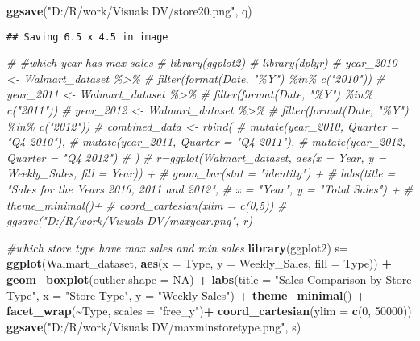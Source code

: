 \documentclass[
]{article}
\newenvironment{Shaded}{\begin{snugshade}}{\end{snugshade}}
\newcommand{\AttributeTok}[1]{\textcolor[rgb]{0.13,0.29,0.53}{#1}}
\newcommand{\CommentTok}[1]{\textcolor[rgb]{0.56,0.35,0.01}{\textit{#1}}}
\newcommand{\ConstantTok}[1]{\textcolor[rgb]{0.56,0.35,0.01}{#1}}
\newcommand{\DecValTok}[1]{\textcolor[rgb]{0.00,0.00,0.81}{#1}}
\newcommand{\FunctionTok}[1]{\textcolor[rgb]{0.13,0.29,0.53}{\textbf{#1}}}
\newcommand{\NormalTok}[1]{#1}
\newcommand{\OtherTok}[1]{\textcolor[rgb]{0.56,0.35,0.01}{#1}}
\newcommand{\SpecialCharTok}[1]{\textcolor[rgb]{0.81,0.36,0.00}{\textbf{#1}}}
\newcommand{\StringTok}[1]{\textcolor[rgb]{0.31,0.60,0.02}{#1}}
\begin{document}
\begin{Shaded}
\begin{Highlighting}[]
\FunctionTok{ggsave}\NormalTok{(}\StringTok{"D:/R/work/Visuals DV/store20.png"}\NormalTok{, q)}
\end{Highlighting}
\end{Shaded}

\begin{verbatim}
## Saving 6.5 x 4.5 in image
\end{verbatim}

\begin{Shaded}
\begin{Highlighting}[]
\CommentTok{\# \#which year has max sales}
\CommentTok{\# library(ggplot2)}
\CommentTok{\# library(dplyr)}
\CommentTok{\# year\_2010 \textless{}{-} Walmart\_dataset \%\textgreater{}\%}
\CommentTok{\#   filter(format(Date, "\%Y") \%in\% c("2010"))}
\CommentTok{\# year\_2011 \textless{}{-} Walmart\_dataset \%\textgreater{}\%}
\CommentTok{\#   filter(format(Date, "\%Y") \%in\% c("2011"))}
\CommentTok{\# year\_2012 \textless{}{-} Walmart\_dataset \%\textgreater{}\%}
\CommentTok{\#   filter(format(Date, "\%Y") \%in\% c("2012"))}
\CommentTok{\# combined\_data \textless{}{-} rbind(}
\CommentTok{\#   mutate(year\_2010, Quarter = "Q4 2010"),}
\CommentTok{\#   mutate(year\_2011, Quarter = "Q4 2011"),}
\CommentTok{\#   mutate(year\_2012, Quarter = "Q4 2012")}
\CommentTok{\# )}
\CommentTok{\# r=ggplot(Walmart\_dataset, aes(x = Year, y = Weekly\_Sales, fill = Year)) +}
\CommentTok{\#   geom\_bar(stat = "identity") +}
\CommentTok{\#   labs(title = "Sales for the Years 2010, 2011 and 2012",}
\CommentTok{\#        x = "Year", y = "Total Sales") +}
\CommentTok{\#   theme\_minimal()+ }
\CommentTok{\#   coord\_cartesian(xlim = c(0,5))}
\CommentTok{\# ggsave("D:/R/work/Visuals DV/maxyear.png", r)}

\CommentTok{\#which store type have max sales and min sales}
\FunctionTok{library}\NormalTok{(ggplot2)}
\NormalTok{s}\OtherTok{=} \FunctionTok{ggplot}\NormalTok{(Walmart\_dataset, }\FunctionTok{aes}\NormalTok{(}\AttributeTok{x =}\NormalTok{ Type, }\AttributeTok{y =}\NormalTok{ Weekly\_Sales, }\AttributeTok{fill =}\NormalTok{ Type)) }\SpecialCharTok{+}
  \FunctionTok{geom\_boxplot}\NormalTok{(}\AttributeTok{outlier.shape =} \ConstantTok{NA}\NormalTok{) }\SpecialCharTok{+}
  \FunctionTok{labs}\NormalTok{(}\AttributeTok{title =} \StringTok{"Sales Comparison by Store Type"}\NormalTok{,}
       \AttributeTok{x =} \StringTok{"Store Type"}\NormalTok{,}
       \AttributeTok{y =} \StringTok{"Weekly Sales"}\NormalTok{) }\SpecialCharTok{+}
  \FunctionTok{theme\_minimal}\NormalTok{() }\SpecialCharTok{+}
  \FunctionTok{facet\_wrap}\NormalTok{(}\SpecialCharTok{\textasciitilde{}}\NormalTok{Type, }\AttributeTok{scales =} \StringTok{"free\_y"}\NormalTok{)}\SpecialCharTok{+}
  \FunctionTok{coord\_cartesian}\NormalTok{(}\AttributeTok{ylim =} \FunctionTok{c}\NormalTok{(}\DecValTok{0}\NormalTok{, }\DecValTok{50000}\NormalTok{))}
\FunctionTok{ggsave}\NormalTok{(}\StringTok{"D:/R/work/Visuals DV/maxminstoretype.png"}\NormalTok{, s)}
\end{Highlighting}
\end{Shaded}
\end{document}
